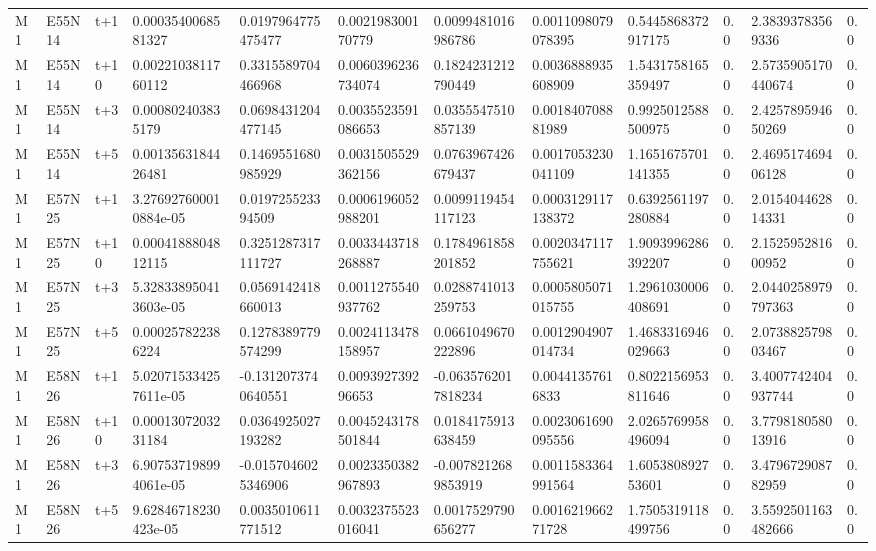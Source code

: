 \begin{landscape}
\begin{longtable}{llllllllllll}
M1 & E55N14 & t+1 & 0.0003540068581327 & 0.0197964775475477 & 0.002198300170779 & 0.0099481016986786 & 0.0011098079078395 & 0.5445868372917175 & 0.0 & 2.38393783569336 & 0.0 \\
M1 & E55N14 & t+10 & 0.0022103811760112 & 0.3315589704466968 & 0.0060396236734074 & 0.1824231212790449 & 0.0036888935608909 & 1.5431758165359497 & 0.0 & 2.5735905170440674 & 0.0 \\
M1 & E55N14 & t+3 & 0.000802403835179 & 0.0698431204477145 & 0.0035523591086653 & 0.0355547510857139 & 0.001840708881989 & 0.9925012588500975 & 0.0 & 2.425789594650269 & 0.0 \\
M1 & E55N14 & t+5 & 0.0013563184426481 & 0.1469551680985929 & 0.0031505529362156 & 0.0763967426679437 & 0.0017053230041109 & 1.1651675701141355 & 0.0 & 2.469517469406128 & 0.0 \\
M1 & E57N25 & t+1 & 3.276927600010884e-05 & 0.019725523394509 & 0.0006196052988201 & 0.0099119454117123 & 0.0003129117138372 & 0.6392561197280884 & 0.0 & 2.015404462814331 & 0.0 \\
M1 & E57N25 & t+10 & 0.0004188804812115 & 0.3251287317111727 & 0.0033443718268887 & 0.1784961858201852 & 0.0020347117755621 & 1.9093996286392207 & 0.0 & 2.152595281600952 & 0.0 \\
M1 & E57N25 & t+3 & 5.328338950413603e-05 & 0.0569142418660013 & 0.0011275540937762 & 0.0288741013259753 & 0.0005805071015755 & 1.2961030006408691 & 0.0 & 2.0440258979797363 & 0.0 \\
M1 & E57N25 & t+5 & 0.000257822386224 & 0.1278389779574299 & 0.0024113478158957 & 0.0661049670222896 & 0.0012904907014734 & 1.4683316946029663 & 0.0 & 2.073882579803467 & 0.0 \\
M1 & E58N26 & t+1 & 5.020715334257611e-05 & -0.1312073740640551 & 0.009392739296653 & -0.0635762017818234 & 0.00441357616833 & 0.8022156953811646 & 0.0 & 3.4007742404937744 & 0.0 \\
M1 & E58N26 & t+10 & 0.0001307203231184 & 0.0364925027193282 & 0.0045243178501844 & 0.0184175913638459 & 0.0023061690095556 & 2.0265769958496094 & 0.0 & 3.779818058013916 & 0.0 \\
M1 & E58N26 & t+3 & 6.907537198994061e-05 & -0.0157046025346906 & 0.0023350382967893 & -0.0078212689853919 & 0.0011583364991564 & 1.605380892753601 & 0.0 & 3.479672908782959 & 0.0 \\
M1 & E58N26 & t+5 & 9.62846718230423e-05 & 0.0035010611771512 & 0.0032375523016041 & 0.0017529790656277 & 0.001621966271728 & 1.7505319118499756 & 0.0 & 3.5592501163482666 & 0.0 \\

\end{longtable}
\end{landscape}
